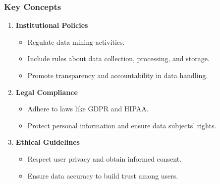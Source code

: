 \documentclass[aspectratio=169]{beamer}
\begin{document}
\begin{frame}[fragile]
    \frametitle{Key Concepts}
    \begin{enumerate}
        \item \textbf{Institutional Policies}
        \begin{itemize}
            \item Regulate data mining activities.
            \item Include rules about data collection, processing, and storage.
            \item Promote transparency and accountability in data handling.
        \end{itemize}

        \item \textbf{Legal Compliance}
        \begin{itemize}
            \item Adhere to laws like GDPR and HIPAA.
            \item Protect personal information and ensure data subjects' rights.
        \end{itemize}

        \item \textbf{Ethical Guidelines}
        \begin{itemize}
            \item Respect user privacy and obtain informed consent.
            \item Ensure data accuracy to build trust among users.
        \end{itemize}
    \end{enumerate}
\end{frame}
\end{document}
